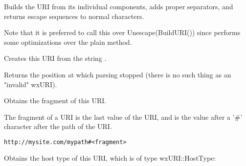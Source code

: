 \label{wxuribuildunescapeduri}


Builds the URI from its individual components, adds proper separators, and
returns escape sequences to normal characters.

Note that it is preferred to call this over Unescape(BuildURI()) since
 performs some optimizations over the plain method.


\label{wxuricreate}


Creates this URI from the string .

Returns the position at which parsing stopped (there 
is no such thing as an "invalid" wxURI).



\label{wxurigetfragment}


Obtains the fragment of this URI.

The fragment of a URI is the last value of the URI,
and is the value after a '#' character after the path 
of the URI.

\tt{http://mysite.com/mypath\#<fragment>}

\label{wxurigethosttype}


Obtains the host type of this URI, which is of type
wxURI::HostType:

\twocolwidtha{7cm}
\begin{twocollist}\itemsep=0pt
\end{twocollist}


\label{wxurigetpassword}


